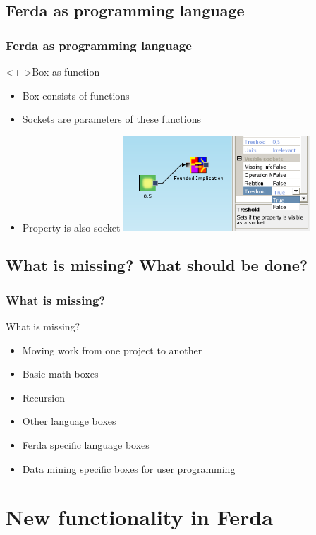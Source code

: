 \documentclass{beamer}
\begin{document}
\subsection{Ferda as programming language}
\begin{frame}
	\frametitle{Ferda as programming language}
	\begin{block}<+->{Box as function}
		\begin{itemize}[<+->]
			\item Box consists of functions
			\item Sockets are parameters of these functions
			\item Property is also socket
				\includegraphics[width=7cm]{property_as_socket}
		\end{itemize}
	\end{block}	
\end{frame}

\subsection{What is missing? What should be done?}
\begin{frame}
	\frametitle{What is missing?}
	\begin{block}{What is missing?}
		\begin{itemize}[<+->]
			\item Moving work from one project to another
			\item Basic math boxes
			\item Recursion
			\item Other language boxes
			\item Ferda specific language boxes
			\item Data mining specific boxes for user programming
		\end{itemize}
	\end{block}
\end{frame}

\section{New functionality in Ferda}
\end{document}
